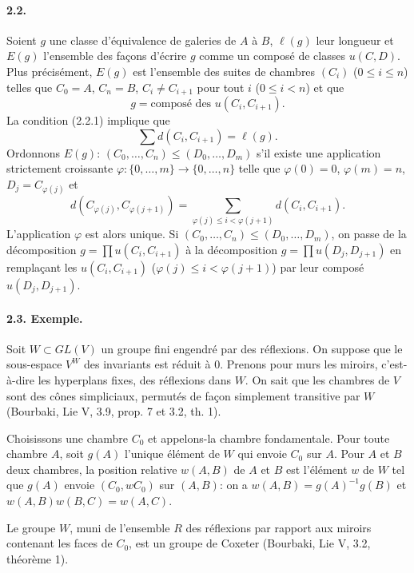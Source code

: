 \documentclass[11pt]{article}
\begin{document}
\paragraph{2.2.} Soient $g$ une classe d'équivalence de galeries de $A$ à $B$, $\ell(g)$ leur longueur et $E(g)$ l'ensemble des façons d'écrire $g$ comme un composé de classes $u(C,D)$. Plus précisément, $E(g)$ est l'ensemble des suites de chambres $(C_i)$ ($0\leq i\leq n$) telles que $C_0=A$, $C_n=B$, $C_i\ne C_{i+1}$ pour tout $i$ ($0\leq i<n$) et que
\begin{equation}
 g=\text{composé des }u(C_i,C_{i+1}).
\tag{2.2.1}
\end{equation}
La condition (2.2.1) implique que
\begin{equation}
 \sum d(C_i,C_{i+1})=\ell(g).
\tag{2.2.2}
\end{equation}
Ordonnons $E(g)$: $(C_0,\ldots,C_n)\leq(D_0,\ldots,D_m)$ s'il existe une application strictement croissante $\varphi:\{0,\ldots,m\}\to\{0,\ldots,n\}$ telle que $\varphi(0)=0$, $\varphi(m)=n$, $D_j=C_{\varphi(j)}$ et
\[
 d(C_{\varphi(j)},C_{\varphi(j+1)})=
 \sum_{\varphi(j)\leq i<\varphi(j+1)}d(C_i,C_{i+1}).
\]
L'application $\varphi$ est alors unique. Si $(C_0,\ldots,C_n)\leq(D_0,\ldots,D_m)$, on passe de la décomposition $g=\prod u(C_i,C_{i+1})$ à la décomposition $g=\prod u(D_j,D_{j+1})$ en remplaçant les $u(C_i,C_{i+1})$ ($\varphi(j)\leq i<\varphi(j+1)$) par leur composé $u(D_j,D_{j+1})$.

\paragraph{2.3. Exemple.} Soit $W\subset GL(V)$ un groupe fini engendré par des réflexions. On suppose que le sous-espace $V^W$ des invariants est réduit à $0$. Prenons pour murs les miroirs, c'est-à-dire les hyperplans fixes, des réflexions dans $W$. On sait que les chambres de $V$ sont des cônes simpliciaux, permutés de façon simplement transitive par $W$ (Bourbaki, Lie V, 3.9, prop. 7 et 3.2, th. 1).

Choisissons une chambre $C_0$ et appelons-la chambre fondamentale. Pour toute chambre $A$, soit $g(A)$ l'unique élément de $W$ qui envoie $C_0$ sur $A$. Pour $A$ et $B$ deux chambres, la position relative $w(A,B)$ de $A$ et $B$ est l'élément $w$ de $W$ tel que $g(A)$ envoie $(C_0,wC_0)$ sur $(A,B)$: on a $w(A,B)=g(A)^{-1}g(B)$ et $w(A,B)w(B,C)=w(A,C)$.

Le groupe $W$, muni de l'ensemble $R$ des réflexions par rapport aux miroirs contenant les faces de $C_0$, est un groupe de Coxeter (Bourbaki, Lie V, 3.2, théorème 1).
\end{document}
